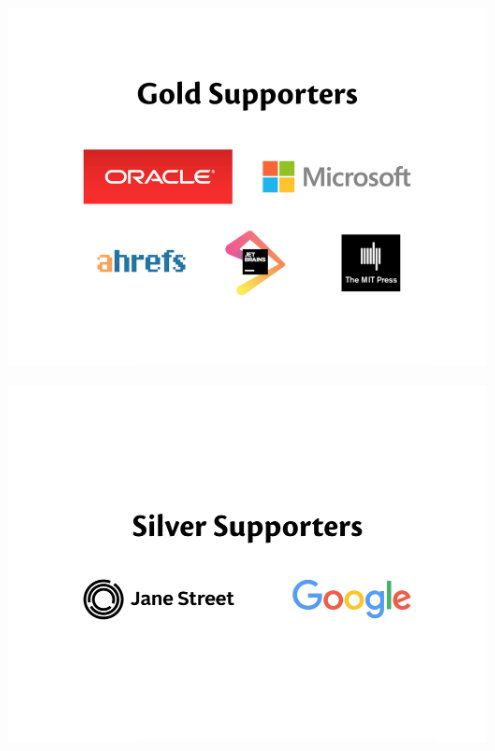 

\begin{center}
\includegraphics[width=0.95\textwidth]{img/supporter-gold.png}
\end{center}

\begin{center}
\includegraphics[width=0.95\textwidth]{img/supporter-silver.png}
\end{center}

